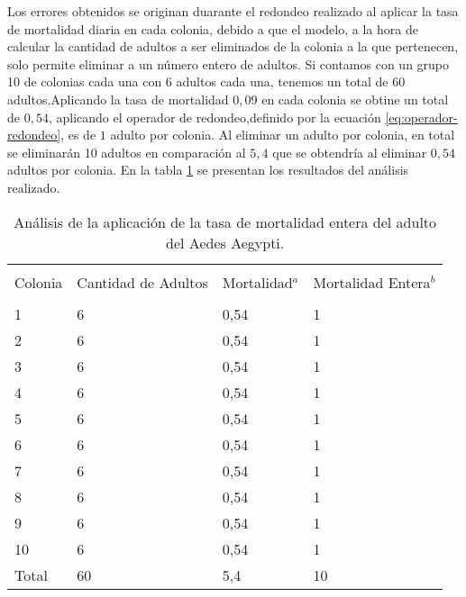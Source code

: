 Los errores obtenidos se originan duarante el redondeo realizado al aplicar la tasa de
mortalidad diaria en cada colonia, debido a que el modelo, a la hora de calcular la cantidad de
adultos a ser eliminados de la colonia a la que pertenecen, solo permite eliminar a un número
entero de adultos. Si contamos con un grupo 10 de colonias cada una con 6 adultos cada una,
tenemos un total de 60 adultos.Aplicando la tasa de mortalidad $0,09$ en cada colonia se obtine un
total de $0,54$, aplicando el operador de redondeo,definido por la ecuación
\eqref{eq:operador-redondeo}, es de $1$ adulto por colonia. Al eliminar un adulto por colonia, en
total se eliminarán 10 adultos en comparación al $5,4$ que se obtendría al eliminar $0,54$ adultos
por colonia. En la  tabla \ref{tab:mortalidad-adulto-error} se presentan los resultados del
análisis realizado.

\begin{table}
    \begin{minipage}{\textwidth}
        \caption{ \label{tab:mortalidad-adulto-error} Análisis de la aplicación de la tasa de
        mortalidad entera del adulto del Aedes Aegypti.}

        \begin{tabular}{p{4cm} p{4cm} p{3cm} l }
                    \hline \\
                    Colonia & Cantidad de Adultos & Mortalidad$^{a}$ & Mortalidad Entera$^{b}$\\
                    \hline
                    \hline \\
                    1       & 6  & 0,54 & 1\\
                    2       & 6  & 0,54 & 1\\
                    3       & 6  & 0,54 & 1\\
                    4       & 6  & 0,54 & 1\\
                    5       & 6  & 0,54 & 1\\
                    6       & 6  & 0,54 & 1\\
                    7       & 6  & 0,54 & 1\\
                    8       & 6  & 0,54 & 1\\
                    9       & 6  & 0,54 & 1\\
                    10      & 6  & 0,54 & 1\\
                    Total   & 60 & 5,4  & 10\\
        \end{tabular}
    \end{minipage}
\end{table}
